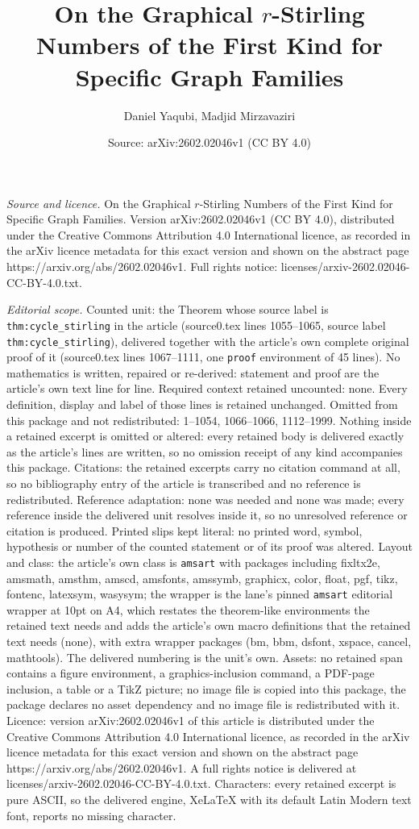 \documentclass[10pt,a4paper]{amsart}
\title[On the Graphical $r$-Stirling Numbers of the First Kind for ]{On the Graphical $r$-Stirling Numbers of the First Kind for Specific Graph Families}
\author{Daniel Yaqubi, Madjid Mirzavaziri}
\date{Source: arXiv:2602.02046v1 (CC BY 4.0)}
\begin{document}
\maketitle

\noindent\emph{Source and licence.} On the Graphical $r$-Stirling Numbers of the First Kind for Specific Graph Families. Version arXiv:2602.02046v1 (CC BY 4.0), distributed under the Creative Commons Attribution 4.0 International licence, as recorded in the arXiv licence metadata for this exact version and shown on the abstract page https://arxiv.org/abs/2602.02046v1. Full rights notice: licenses/arxiv-2602.02046-CC-BY-4.0.txt.\par\smallskip

\noindent\textit{Editorial scope.} Counted unit: the Theorem whose source label is \texttt{thm:cycle\_stirling} in the article (source0.tex lines 1055--1065, source label \texttt{thm:cycle\_stirling}), delivered together with the article's own complete original proof of it (source0.tex lines 1067--1111, one \texttt{proof} environment of 45 lines). No mathematics is written, repaired or re-derived: statement and proof are the article's own text line for line. Required context retained uncounted: none. Every definition, display and label of those lines is retained unchanged. Omitted from this package and not redistributed: 1--1054, 1066--1066, 1112--1999. Nothing inside a retained excerpt is omitted or altered: every retained body is delivered exactly as the article's lines are written, so no omission receipt of any kind accompanies this package. Citations: the retained excerpts carry no citation command at all, so no bibliography entry of the article is transcribed and no reference is redistributed. Reference adaptation: none was needed and none was made; every reference inside the delivered unit resolves inside it, so no unresolved reference or citation is produced. Printed slips kept literal: no printed word, symbol, hypothesis or number of the counted statement or of its proof was altered. Layout and class: the article's own class is \texttt{amsart} with packages including fixltx2e, amsmath, amsthm, amscd, amsfonts, amssymb, graphicx, color, float, pgf, tikz, fontenc, latexsym, wasysym; the wrapper is the lane's pinned \texttt{amsart} editorial wrapper at 10pt on A4, which restates the theorem-like environments the retained text needs and adds the article's own macro definitions that the retained text needs (none), with extra wrapper packages (bm, bbm, dsfont, xspace, cancel, mathtools). The delivered numbering is the unit's own. Assets: no retained span contains a figure environment, a graphics-inclusion command, a PDF-page inclusion, a table or a TikZ picture; no image file is copied into this package, the package declares no asset dependency and no image file is redistributed with it. Licence: version arXiv:2602.02046v1 of this article is distributed under the Creative Commons Attribution 4.0 International licence, as recorded in the arXiv licence metadata for this exact version and shown on the abstract page https://arxiv.org/abs/2602.02046v1. A full rights notice is delivered at licenses/arxiv-2602.02046-CC-BY-4.0.txt. Characters: every retained excerpt is pure ASCII, so the delivered engine, XeLaTeX with its default Latin Modern text font, reports no missing character.
\end{document}
